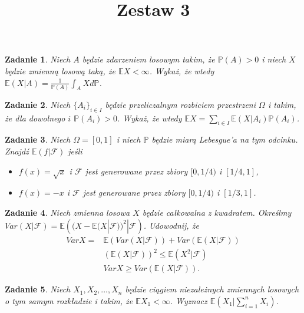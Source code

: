 \documentclass{mwart}
\title{Zestaw 3}
\newtheorem{zd}{Zadanie}
\begin{document}

\maketitle

\begin{zd}
Niech $A$ będzie zdarzeniem losowym takim, że $\mathbb{P}(A) > 0$ i niech $X$ będzie zmienną losową taką, że $\mathbb{E}X < \infty$. Wykaż, że wtedy $\mathbb{E}(X|A) = \frac{1}{\mathbb{P}(A)}\int_AXd\mathbb{P}$.
\end{zd}

\begin{zd}
Niech $\{A_i\}_{i \in I}$ będzie przeliczalnym rozbiciem przestrzeni $\Omega$ i takim, że dla dowolnego $i$ $\mathbb{P}(A_i) > 0$. Wykaż, że wtedy $\mathbb{E}X = \sum_{i\in I}\mathbb{E}(X|A_i)\mathbb{P}(A_i)$.
\end{zd}

\begin{zd}
Niech $\Omega = [0, 1]$ i niech $\mathbb{P}$ będzie miarą Lebesgue'a na tym odcinku. Znajdź $\mathbb{E}(f|\mathcal{F})$ jeśli
\begin{itemize}
\item $f(x) = \sqrt{x}$ i $\mathcal{F}$ jest generowane przez zbiory $[0, 1/4)$ i $[1/4, 1]$,
\item $f(x) = -x$ i $\mathcal{F}$ jest generowane przez zbiory $[0, 1/4)$ i $[1/3, 1]$.
\end{itemize}
\end{zd}

\begin{zd}
	Niech zmienna losowa $X$ będzie całkowalna z kwadratem. Określmy $Var (X|\mathcal{F}) = \mathbb{E}\left((X-\mathbb{E}(X|\mathcal{F}))^2|\mathcal{F}\right)$. Udowodnij, że
	\begin{displaymath}
	\begin{split}
	VarX = &\mathbb{E}\left(Var(X|\mathcal{F})\right) + Var\left(\mathbb{E}(X|\mathcal{F})\right)\\ &\left(\mathbb{E}(X|\mathcal{F})\right)^2 \leq \mathbb{E}(X^2|\mathcal{F})\\
	& VarX \geq Var\left(\mathbb{E}(X|\mathcal{F})\right).
	\end{split}
	\end{displaymath}
\end{zd}

\begin{zd}
Niech $X_1, X_2, \dots, X_n$ będzie ciągiem niezależnych zmiennych losowych o tym samym rozkładzie i takim, że $\mathbb{E}X_1 < \infty$. Wyznacz $\mathbb{E}(X_1|\sum_{i=1}^nX_i)$.
\end{zd}
\end{document}
